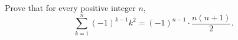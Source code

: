 Prove that for every positive integer $n$,
\[
\sum_{k=1}^{n}(-1)^{k-1}k^2=(-1)^{n-1}\cdot\dfrac{n(n+1)}{2}.
\]

